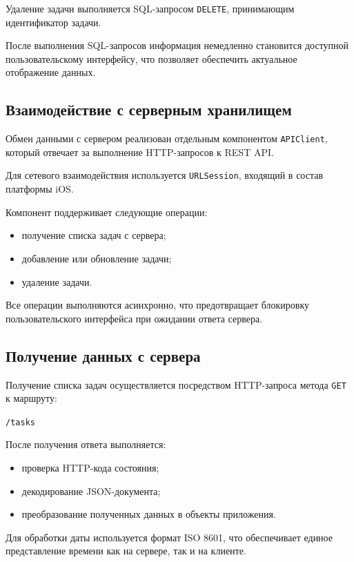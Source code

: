 \documentclass[14pt,a4paper]{extarticle}
\begin{document}
Удаление задачи выполняется SQL-запросом \texttt{DELETE}, принимающим идентификатор задачи.

После выполнения SQL-запросов информация немедленно становится доступной пользовательскому интерфейсу, что позволяет обеспечить актуальное отображение данных.

\subsection{Взаимодействие с серверным хранилищем}

Обмен данными с сервером реализован отдельным компонентом \texttt{APIClient}, который отвечает за выполнение HTTP-запросов к REST API.

Для сетевого взаимодействия используется \texttt{URLSession}, входящий в состав платформы iOS.

Компонент поддерживает следующие операции:

\begin{itemize}
    \item получение списка задач с сервера;
    \item добавление или обновление задачи;
    \item удаление задачи.
\end{itemize}

Все операции выполняются асинхронно, что предотвращает блокировку пользовательского интерфейса при ожидании ответа сервера.

\subsection{Получение данных с сервера}

Получение списка задач осуществляется посредством HTTP-запроса метода \texttt{GET} к маршруту:

\begin{center}
\texttt{/tasks}
\end{center}

После получения ответа выполняется:

\begin{itemize}
    \item проверка HTTP-кода состояния;
    \item декодирование JSON-документа;
    \item преобразование полученных данных в объекты приложения.
\end{itemize}

Для обработки даты используется формат ISO 8601, что обеспечивает единое представление времени как на сервере, так и на клиенте.
\end{document}
